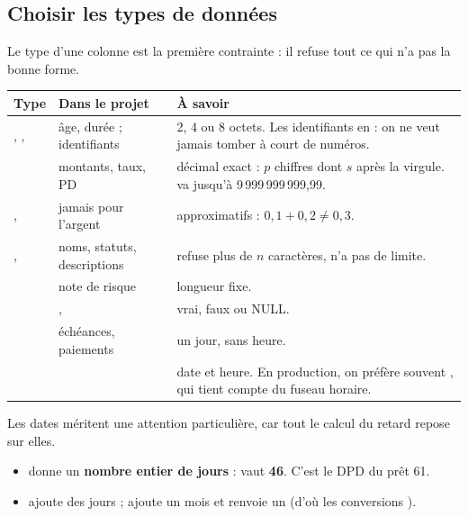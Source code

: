 \subsection{Choisir les types de données}

Le type d'une colonne est la première contrainte : il refuse tout ce qui n'a pas la bonne forme.

\begin{center}\small
\begin{tabularx}{\linewidth}{@{}P{3.1cm} P{3.6cm} L@{}}
\toprule
\textbf{Type} & \textbf{Dans le projet} & \textbf{À savoir} \\
\midrule
{}, ,  & âge, durée ; identifiants & 2, 4 ou 8 octets. Les
identifiants en  : on ne veut jamais tomber à court de numéros. \\
 & montants, taux, PD & décimal exact : $p$ chiffres dont $s$ après la virgule.
 va jusqu'à 9\,999\,999\,999,99. \\
,  & jamais pour l'argent & approximatifs : $0{,}1 + 0{,}2 \neq 0{,}3$. \\
,  & noms, statuts, descriptions &  refuse plus de $n$
caractères,  n'a pas de limite. \\
 & note de risque & longueur fixe. \\
 & ,  & vrai, faux ou NULL. \\
 & échéances, paiements & un jour, sans heure. \\
 &  & date et heure. En production, on préfère souvent
, qui tient compte du fuseau horaire. \\
\bottomrule
\end{tabularx}
\end{center}

Les dates méritent une attention particulière, car tout le calcul du retard repose sur elles.

\begin{itemize}
\item {} donne un \textbf{nombre entier de jours} :
 vaut \textbf{46}. C'est le DPD du prêt 61.
\item {} ajoute des jours ;  ajoute un mois et
renvoie un  (d'où les conversions ).
\end{itemize}

